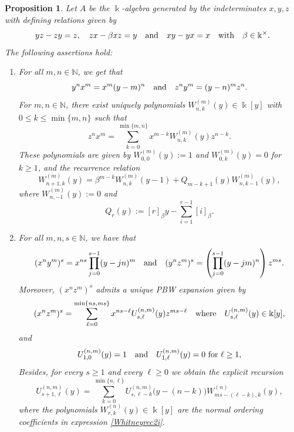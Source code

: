 \documentclass{amsart}
\newtheorem{proposition}[theorem]{Proposition}
\theoremstyle{definition}
\theoremstyle{remark}
\numberwithin{equation}{section}
\begin{document}
\begin{proposition}\label{case(2)(i)}
Let $A$ be the $\Bbbk$-algebra generated by the indeterminates $x,y,z$ with defining relations given by 
\[
yz - zy = z, \quad zx - \beta xz = y  \quad {\rm and}\quad xy - yx = x \quad {\rm with} \quad \beta \in \Bbbk^{\times}. 
\]
The following assertions hold:
\begin{enumerate}
\item [\rm (1)] For all $m,n\in\mathbb{N}$, we get that 
\[
y^n x^m = x^m (y-m)^n \quad {\rm and} \quad z^n y^m = (y-n)^m z^n.
\]
For $m, n \in \mathbb{N}$, there exist uniquely polynomials $W^{(m)}_{n,k}(y)\in\Bbbk[y]$ with $0\le k\le \min\{m,n\}$ such that
\begin{equation}\label{znxmW2i}
z^n x^m = \sum_{k=0}^{\min\{m,n\}}x^{m-k}W^{(m)}_{n,k}(y)z^{n-k}.
\end{equation}
These polynomials are given by $W^{(m)}_{0,0}(y) :=1$ and $W^{(m)}_{0,k}(y) = 0$ for $k\ge 1$, and the recurrence relation
\begin{equation}\label{Whitneyrec2i}
W^{(m)}_{n+1,k}(y) = \beta^{m-k}W^{(m)}_{n,k}(y-1)+Q_{m-k+1}(y)W^{(m)}_{n,k-1}(y),
\end{equation}
where $W^{(m)}_{n,-1}(y):=0$ and
\begin{equation}\label{Qmdef2i}
Q_r(y):=[r]_{\beta} y-\sum_{i=1}^{r-1}[i]_{\beta}.
\end{equation}

\item [\rm (2)] For all $m,n,s\in\mathbb{N}$, we have that 
\[
(x^n y^m)^s=x^{ns}\prod_{j=0}^{s-1}(y-jn)^m \quad {\rm and} \quad (y^n z^m)^s = \left(\prod_{j=0}^{s-1}(y-jm)^n\right)z^{ms}.
\]
Moreover, $(x^n z^m)^s$ admits a unique PBW expansion given by 
\begin{equation}\label{xnzmUdef2i}
(x^n z^m)^s=\sum_{\ell=0}^{\min\{ns,ms\}}x^{ns-\ell}U^{(n,m)}_{s,\ell}(y)z^{ms-\ell}
\quad {\rm where} \quad U^{(n,m)}_{s,\ell}(y)\in\Bbbk[y],
\end{equation}
and
\[
U^{(n,m)}_{1,0}(y)=1 \quad {\rm and} \quad U^{(n,m)}_{1,\ell}(y)=0 \text{ for } \ell\ge 1,
\]
Besides, for every $s\ge 1$ and every $\ell\ge 0$ we obtain the explicit recursion
\begin{equation}\label{Urecexplicit2i}
U^{(n,m)}_{s+1,\ell}(y) =\sum_{k=0}^{\min\{n,\ell\}}U^{(n,m)}_{s,\ell-k}\big(y-(n-k)\big)W^{(n)}_{ms-(\ell-k),k}(y),
\end{equation}
where the polynomials $W^{(n)}_{r,k}(y)\in\Bbbk[y]$ are the normal ordering coefficients in expression \eqref{Whitneyrec2i}.


\end{enumerate}
\end{proposition}
\end{document}
